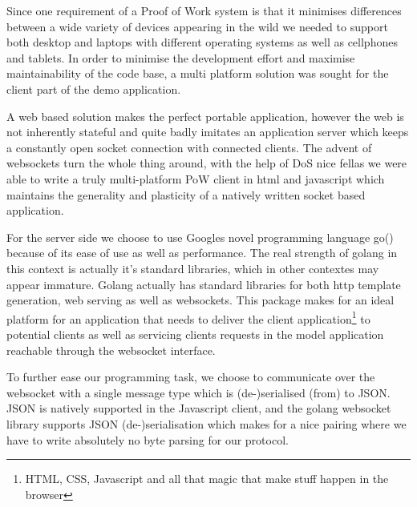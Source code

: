 Since one requirement of a Proof of Work system is that it minimises differences between a wide variety of devices appearing in the wild we needed to support both desktop and laptops with different operating systems as well as cellphones and tablets.
In order to minimise the development effort and maximise maintainability of the code base, a multi platform solution was sought for the client part of the demo application. 

A web based solution makes the perfect portable application, however the web is not inherently stateful and quite badly imitates an application server which keeps a constantly open socket connection with connected clients. The advent of websockets turn the whole thing around, with the help of DoS nice fellas we were able to write a truly multi-platform PoW client in html and javascript which maintains the generality and plasticity of a natively written socket based application. 

For the server side we choose to use Googles novel programming language go() because of its ease of use as well as performance. The real strength of golang in this context is actually it's standard libraries, which in other contextes may appear immature. Golang actually has standard libraries for both http template generation, web serving as well as websockets. This package makes for an ideal platform for an application that needs to deliver the client application\footnote{HTML, CSS, Javascript and all that magic that make stuff happen in the browser} to potential clients as well as servicing clients requests in the model application reachable through the websocket interface. 

To further ease our programming task, we choose to communicate over the websocket with a single message type which is (de-)serialised (from) to JSON. JSON is natively supported in the Javascript client, and the golang websocket library supports JSON (de-)serialisation which makes for a nice pairing where we have to write absolutely no byte parsing for our protocol.

